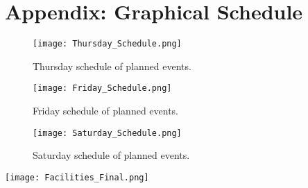 \section{Appendix: Graphical Schedule}
\label{appendix:schedule}
\begin{figure}[H]
	\centering
	\texttt{[image: Thursday\_Schedule.png]}
	\caption{Thursday schedule of planned events.}
\end{figure}
\begin{figure}[H]
	\centering
	\texttt{[image: Friday\_Schedule.png]}
	\caption{Friday schedule of planned events.}
\end{figure}
\begin{figure}[H]
	\centering
	\texttt{[image: Saturday\_Schedule.png]}
	\caption{Saturday schedule of planned events.}
\end{figure}

\newpage
\begin{landscape}
	\centering
	{\texttt{[image: Facilities\_Final.png]}}
\end{landscape}